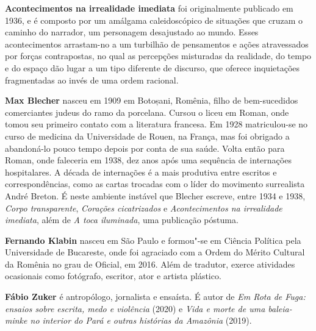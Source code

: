 \textbf{Acontecimentos na irrealidade imediata} foi originalmente publicado em 1936, e é composto por um amálgama caleidoscópico de situações que cruzam o caminho do narrador, um personagem desajustado ao mundo. Esses acontecimentos arrastam-no a um turbilhão de pensamentos e ações atravessados por forças contrapostas, no qual as percepções misturadas da realidade, do tempo e do espaço dão lugar a um tipo diferente de discurso, que oferece inquietações fragmentadas ao invés de uma ordem racional.

\textbf{Max Blecher} nasceu em 1909 em Botoșani, Romênia, filho de bem-sucedidos comerciantes judeus do ramo da porcelana. Cursou o liceu em Roman, onde tomou seu primeiro contato com a literatura francesa. Em 1928 matriculou-se no curso de medicina da Universidade de Rouen, na França, mas foi obrigado a abandoná-lo pouco tempo depois por conta de sua saúde. Volta então para Roman, onde faleceria em 1938, dez anos após uma sequência de internações hospitalares. A década de internações é a mais produtiva entre escritos e correspondências, como as cartas trocadas com o líder do movimento surrealista André Breton. É neste ambiente instável que Blecher escreve, entre 1934 e 1938, \textit{Corpo transparente}, \textit{Corações cicatrizados} e \textit{Acontecimentos na irrealidade imediata}, além de \textit{A toca iluminada}, uma publicação póstuma.

\textbf{Fernando Klabin} nasceu em São Paulo e formou"-se em Ciência Política pela Universidade de Bucareste, onde foi agraciado com a Ordem do Mérito Cultural da Romênia no grau de Oficial, em 2016. Além de tradutor, exerce atividades ocasionais como fotógrafo, escritor, ator e artista plástico.

\textbf{Fábio Zuker} é antropólogo, jornalista e ensaísta. É autor de \textit{Em Rota de Fuga: ensaios sobre escrita, medo e violência} (2020) e \textit{Vida e morte de uma baleia-minke no interior do Pará e outras histórias da Amazônia} (2019).

